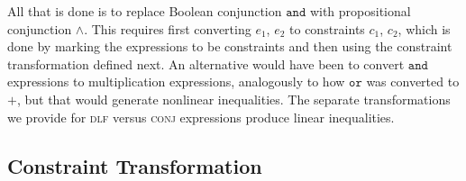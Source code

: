 \documentclass[preprint]{sigplanconf}%
\theoremstyle{remark}
\begin{document}
All that is done is to replace Boolean conjunction $\mathtt{and}$ with
propositional conjunction $\wedge$. This requires first converting $e_{1}$,
$e_{2}$ to constraints $c_{1}$, $c_{2}$, which is done by marking the
expressions to be constraints and then using the constraint transformation
defined next. An alternative would have been to convert $\mathtt{and}$
expressions to multiplication expressions, analogously to how $\mathtt{or}$
was converted to $+$, but that would generate nonlinear inequalities. The
separate transformations we provide for \textsc{dlf} versus \textsc{conj}
expressions produce linear inequalities.

\subsection{Constraint Transformation}
\end{document}
